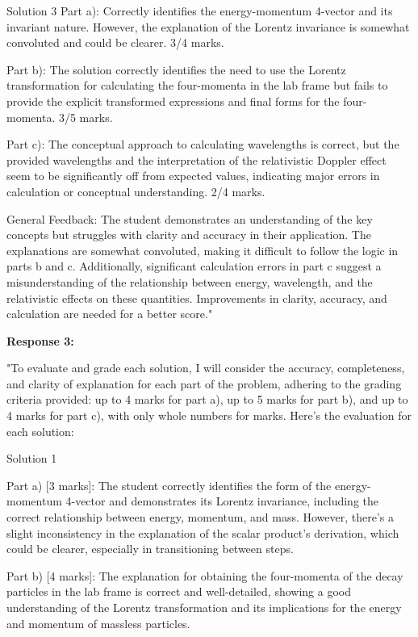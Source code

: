 \documentclass[a4paper,11pt]{article}
\begin{document}
Solution 3
Part a): Correctly identifies the energy-momentum 4-vector and its invariant nature. However, the explanation of the Lorentz invariance is somewhat convoluted and could be clearer. 3/4 marks.

Part b): The solution correctly identifies the need to use the Lorentz transformation for calculating the four-momenta in the lab frame but fails to provide the explicit transformed expressions and final forms for the four-momenta. 3/5 marks.

Part c): The conceptual approach to calculating wavelengths is correct, but the provided wavelengths and the interpretation of the relativistic Doppler effect seem to be significantly off from expected values, indicating major errors in calculation or conceptual understanding. 2/4 marks.

General Feedback: The student demonstrates an understanding of the key concepts but struggles with clarity and accuracy in their application. The explanations are somewhat convoluted, making it difficult to follow the logic in parts b and c. Additionally, significant calculation errors in part c suggest a misunderstanding of the relationship between energy, wavelength, and the relativistic effects on these quantities. Improvements in clarity, accuracy, and calculation are needed for a better score."

\textbf{Response 3:}

"To evaluate and grade each solution, I will consider the accuracy, completeness, and clarity of explanation for each part of the problem, adhering to the grading criteria provided: up to 4 marks for part a), up to 5 marks for part b), and up to 4 marks for part c), with only whole numbers for marks. Here's the evaluation for each solution:

Solution 1

Part a) [3 marks]: The student correctly identifies the form of the energy-momentum 4-vector and demonstrates its Lorentz invariance, including the correct relationship between energy, momentum, and mass. However, there's a slight inconsistency in the explanation of the scalar product's derivation, which could be clearer, especially in transitioning between steps.

Part b) [4 marks]: The explanation for obtaining the four-momenta of the decay particles in the lab frame is correct and well-detailed, showing a good understanding of the Lorentz transformation and its implications for the energy and momentum of massless particles.
\end{document}
